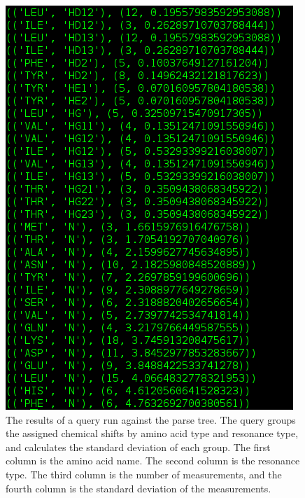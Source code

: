\begin{figure}
  \includegraphics[scale=0.5]{figures/nmrpystar_query}
  \caption[The results of a query run against the parse tree]
          {The results of a query run against the parse tree.
           The query groups the assigned chemical shifts by
           amino acid type and resonance type, and calculates the 
           standard deviation of each group.  The first column
           is the amino acid name.  The second column is the resonance type.
           The third column is the number of measurements, and
           the fourth column is the standard deviation of the
           measurements.}
  \label{nmrpystar_query}
\end{figure}


